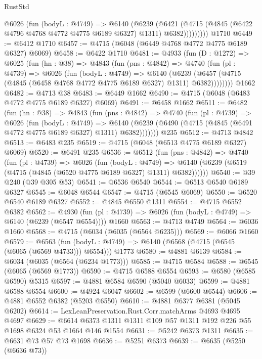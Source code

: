 \begin{lexlean}{RustStd}
\begin{coremodule}
            @6026
              (fun (bodyL : @4749) =>
              @6140
                (@6239
                  (@6421
                    (@4715 (@4845 (@6422 @4796 @4768 @4772 @4775 @6189 @6327) @1311) @6382)))))))))
    @1710
@6449 := @6412 @1710
@6457 := @4715 (@6048 (@6449 @4768 @4772 @4775 @6189 @6327) @6069)
@6458 := @6422 @1710
@6481 := @4933
    (fun (D : @1272) =>
    @6025
      (fun (hn : @38) =>
      @4843
        (fun (pns : @4842) =>
        @4740
          (fun (pl : @4739) =>
          @6026
            (fun (bodyL : @4749) =>
            @6140
              (@6239 (@6457 (@4715 (@4845 (@6458 @4768 @4772 @4775 @6189 @6327) @1311) @6382))))))))
    @1662
@6482 := @4713 @38
@6483 := @6449 @1662
@6490 := @4715 (@6048 (@6483 @4772 @4775 @6189 @6327) @6069)
@6491 := @6458 @1662
@6511 := @6482
    (fun (hn : @38) =>
    @4843
      (fun (pns : @4842) =>
      @4740
        (fun (pl : @4739) =>
        @6026
          (fun (bodyL : @4749) =>
          @6140 (@6239 (@6490 (@4715 (@4845 (@6491 @4772 @4775 @6189 @6327) @1311) @6382)))))))
    @235
@6512 := @4713 @4842
@6513 := @6483 @235
@6519 := @4715 (@6048 (@6513 @4775 @6189 @6327) @6069)
@6520 := @6491 @235
@6536 := @6512
    (fun (pns : @4842) =>
    @4740
      (fun (pl : @4739) =>
      @6026
        (fun (bodyL : @4749) =>
        @6140 (@6239 (@6519 (@4715 (@4845 (@6520 @4775 @6189 @6327) @1311) @6382))))))
@6540 := @39 @240 (@39 @305 @53)
@6541 := @6536 @6540
@6544 := @6513 @6540 @6189 @6327
@6545 := @6048 @6544
@6547 := @4715 (@6545 @6069)
@6550 := @6520 @6540 @6189 @6327
@6552 := @4845 @6550 @1311
@6554 := @4715 @6552 @6382
@6562 := @4930
    (fun (pl : @4739) => @6026 (fun (bodyL : @4749) => @6140 (@6239 (@6547 @6554))))
    @1660
@6563 := @4713 @4749
@6564 := @6036 @1660
@6568 := @4715 (@6034 (@6035 (@6564 @6235)))
@6569 := @6066 @1660
@6579 := @6563
    (fun (bodyL : @4749) => @6140 (@6568 (@4715 (@6545 (@6065 (@6569 @4733))) @6554)))
    @1773
@6580 := @4881 @6139
@6584 := @6034 (@6035 (@6564 (@6234 @1773)))
@6585 := @4715 @6584
@6588 := @6545 (@6065 (@6569 @1773))
@6590 := @4715 @6588 @6554
@6593 := @6580 (@6585 @6590) @5315
@6597 := @4881 @6584 @6590 (@5040 @6033)
@6599 := @4881 @6588 @6554
@6600 := @4924 @6047
@6602 := @6599 (@6600 @6544)
@6606 := @4881 @6552 @6382 (@5203 @6550)
@6610 := @4881 @6377 @6381 (@5045 @6202)
@6614 := LexLeanPreservation.Rust.Corr.matchArms @4693 @4695 @4697
@6629 := @6614 @6373 @1311 @1311 @109 @57 @1311 @192 @226 @55 @1698 @6324 @53 @1664 @146 @1554
@6631 := @5242 @6373 @1311
@6635 := @6631 @73 @57 @73 @1698
@6636 := @5251 @6373
@6639 := @6635 (@5250 (@6636 @73))

\end{coremodule}
\end{lexlean}
